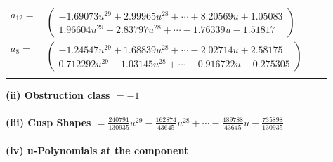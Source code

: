 \documentclass[1p]{elsarticle_modified}
\theoremstyle{definition}
\begin{document}
\begin{tabular}{m{7pt} m{180pt} m{7pt} m{180pt} }
\flushright $a_{12}=$&$\begin{pmatrix}-1.69073 u^{29}+2.99965 u^{28}+\cdots+8.20569 u+1.05083\\1.96604 u^{29}-2.83797 u^{28}+\cdots-1.76339 u-1.51817\end{pmatrix}$ \\
\flushright $a_{8}=$&$\begin{pmatrix}-1.24547 u^{29}+1.68839 u^{28}+\cdots-2.02714 u+2.58175\\0.712292 u^{29}-1.03145 u^{28}+\cdots-0.916722 u-0.275305\end{pmatrix}$\\&\end{tabular}
\flushleft \textbf{(ii) Obstruction class $= -1$}\\~\\
\flushleft \textbf{(iii) Cusp Shapes $= \frac{240791}{130935} u^{29}-\frac{162874}{43645} u^{28}+\cdots-\frac{489788}{43645} u-\frac{735898}{130935}$}\\~\\
\newpage\renewcommand{\arraystretch}{1}
\flushleft \textbf{(iv) u-Polynomials at the component}\newline \\
\end{document}
